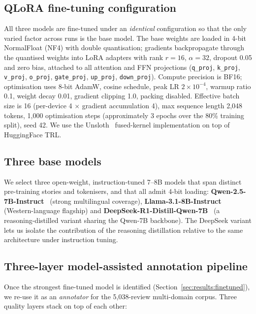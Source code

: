 \documentclass[runningheads]{llncs}
\begin{document}
\subsection{QLoRA fine-tuning configuration}
\label{sec:method:qlora}

All three models are fine-tuned under an \emph{identical} configuration so
that the only varied factor across runs is the base model. The base weights
are loaded in 4-bit NormalFloat (NF4) with double quantisation; gradients
backpropagate through the quantised weights into LoRA adapters with rank
$r=16$, $\alpha=32$, dropout 0.05 and zero bias, attached to all
attention and FFN projections (\texttt{q\_proj}, \texttt{k\_proj},
\texttt{v\_proj}, \texttt{o\_proj}, \texttt{gate\_proj}, \texttt{up\_proj},
\texttt{down\_proj}). Compute precision is BF16; optimisation uses
8-bit AdamW, cosine schedule, peak LR $2\!\times\!10^{-4}$, warmup ratio
0.1, weight decay 0.01, gradient clipping 1.0, packing disabled. Effective
batch size is 16 (per-device 4 $\times$ gradient accumulation 4), max
sequence length 2{,}048 tokens, 1{,}000 optimisation steps (approximately 3
epochs over the 80\% training split), seed 42. We use the
Unsloth~\cite{Qwen2024-kr} fused-kernel implementation on top of
HuggingFace TRL.

\subsection{Three base models}
\label{sec:method:models}

We select three open-weight, instruction-tuned 7--8B models that span
distinct pre-training stories and tokenisers, and that all admit 4-bit
loading: \textbf{Qwen-2.5-7B-Instruct}~\cite{Qwen2024-kr} (strong
multilingual coverage), \textbf{Llama-3.1-8B-Instruct}~\cite{Grattafiori2024-ka}
(Western-language flagship) and
\textbf{DeepSeek-R1-Distill-Qwen-7B}~\cite{DeepSeek-AI2026-vt} (a
reasoning-distilled variant sharing the Qwen-7B backbone). The DeepSeek
variant lets us isolate the contribution of the reasoning distillation
relative to the same architecture under instruction tuning.

\subsection{Three-layer model-assisted annotation pipeline}
\label{sec:method:pipeline}

Once the strongest fine-tuned model is identified
(Section~\ref{sec:results:finetuned}), we re-use it as an \emph{annotator}
for the 5{,}038-review multi-domain corpus. Three quality layers stack on
top of each other:
\end{document}
